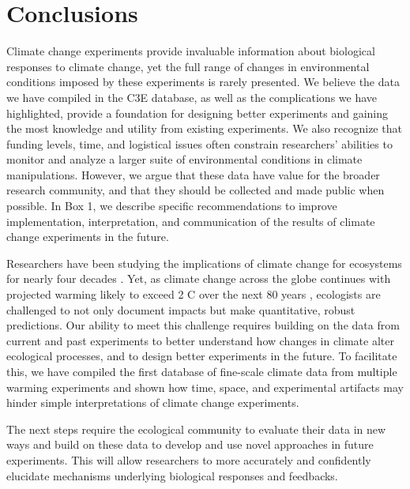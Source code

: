 \documentclass{article}
\begin{document}
\section* {Conclusions}
 \par Climate change experiments provide invaluable information about biological responses to climate change, yet the full range of changes in environmental conditions imposed by these experiments is rarely presented. We believe the data we have compiled in the C3E database, as well as the complications we have highlighted, provide a foundation for designing better experiments and gaining the most knowledge and utility from existing experiments. We also recognize that funding levels, time, and logistical issues often constrain researchers' abilities to monitor and analyze a larger suite of environmental conditions in climate manipulations. However, we argue that these data have value for the broader research community, and that they should be collected and made public when possible. In Box 1, we describe specific recommendations to improve implementation, interpretation, and communication of the results of climate change experiments in the future. %
 \par Researchers have been studying the implications of climate change for ecosystems for nearly four decades \citep[e.g.,][]{tamaki1981,carlson1982}.
Yet, as climate change across the globe continues with projected warming likely to exceed 2 \degree C over the next 80 years \citep{ipcc2013}, ecologists are challenged to not only document impacts but make quantitative, robust predictions. Our ability to meet this challenge requires building on the data from current and past experiments to better understand how changes in climate alter ecological processes, and to design better experiments in the future. To facilitate this, we have compiled the first database of fine-scale climate data from multiple warming experiments and shown how time, space, and experimental artifacts may hinder simple interpretations of climate change experiments. 

\par The next steps require the ecological community to evaluate their data in new ways and build on these data to develop and use novel approaches in future experiments. This will allow researchers to more accurately and confidently elucidate mechanisms underlying biological responses and feedbacks. %
\end{document}

